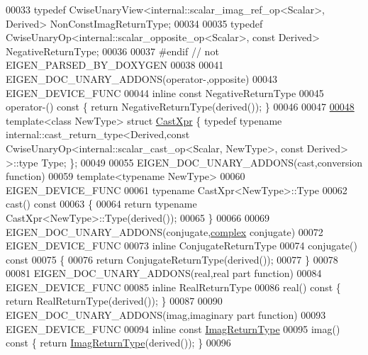 \begin{DoxyCode}
00033 \textcolor{keyword}{typedef} CwiseUnaryView<internal::scalar\_imag\_ref\_op<Scalar>, Derived> NonConstImagReturnType;
00034 
00035 \textcolor{keyword}{typedef} CwiseUnaryOp<internal::scalar\_opposite\_op<Scalar>, \textcolor{keyword}{const} Derived> NegativeReturnType;
00036 
00037 \textcolor{preprocessor}{#endif // not EIGEN\_PARSED\_BY\_DOXYGEN}
00038 
00041 EIGEN\_DOC\_UNARY\_ADDONS(\textcolor{keyword}{operator}-,opposite)
00043 EIGEN\_DEVICE\_FUNC
00044 \textcolor{keyword}{inline} \textcolor{keyword}{const} NegativeReturnType
00045 operator-()\textcolor{keyword}{ const }\{ \textcolor{keywordflow}{return} NegativeReturnType(derived()); \}
00046 
00047 
\hyperlink{struct_cast_xpr}{00048} \textcolor{keyword}{template}<\textcolor{keyword}{class} NewType> \textcolor{keyword}{struct }\hyperlink{struct_cast_xpr}{CastXpr} \{ \textcolor{keyword}{typedef} \textcolor{keyword}{typename} internal::cast\_return\_type<Derived,const
       CwiseUnaryOp<internal::scalar\_cast\_op<Scalar, NewType>, \textcolor{keyword}{const} Derived> >::type Type; \};
00049 
00055 EIGEN\_DOC\_UNARY\_ADDONS(cast,conversion \textcolor{keyword}{function})
00059 \textcolor{keyword}{template}<\textcolor{keyword}{typename} NewType>
00060 EIGEN\_DEVICE\_FUNC
00061 \textcolor{keyword}{typename} CastXpr<NewType>::Type
00062 cast()\textcolor{keyword}{ const}
00063 \textcolor{keyword}{}\{
00064   \textcolor{keywordflow}{return} \textcolor{keyword}{typename} CastXpr<NewType>::Type(derived());
00065 \}
00066 
00069 EIGEN\_DOC\_UNARY\_ADDONS(conjugate,\hyperlink{structcomplex}{complex} conjugate)
00072 EIGEN\_DEVICE\_FUNC
00073 \textcolor{keyword}{inline} ConjugateReturnType
00074 conjugate()\textcolor{keyword}{ const}
00075 \textcolor{keyword}{}\{
00076   \textcolor{keywordflow}{return} ConjugateReturnType(derived());
00077 \}
00078 
00081 EIGEN\_DOC\_UNARY\_ADDONS(real,real part \textcolor{keyword}{function})
00084 EIGEN\_DEVICE\_FUNC
00085 \textcolor{keyword}{inline} RealReturnType
00086 real()\textcolor{keyword}{ const }\{ \textcolor{keywordflow}{return} RealReturnType(derived()); \}
00087 
00090 EIGEN\_DOC\_UNARY\_ADDONS(imag,imaginary part \textcolor{keyword}{function})
00093 EIGEN\_DEVICE\_FUNC
00094 \textcolor{keyword}{inline} \textcolor{keyword}{const} \hyperlink{group___core___module_class_eigen_1_1_cwise_unary_op}{ImagReturnType}
00095 imag()\textcolor{keyword}{ const }\{ \textcolor{keywordflow}{return} \hyperlink{group___core___module_class_eigen_1_1_cwise_unary_op}{ImagReturnType}(derived()); \}
00096 

\end{DoxyCode}
